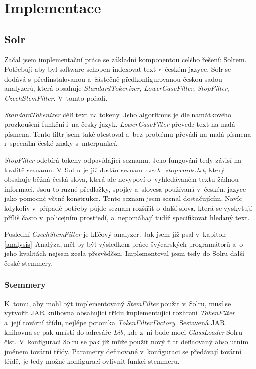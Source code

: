 \chapter{Implementace}
\section{Solr}
Začal jsem implementační práce se základní komponentou celého řešení: Solrem. Potřebuji aby byl software schopen indexovat text v~českém jazyce. Solr se dodává s~předinstalovanou a~částečně předkonfigurovanou českou sadou analyzerů, která obsahuje \emph{StandardTokenizer}, \emph{LowerCaseFilter}, \emph{StopFilter}, \emph{CzechStemFilter}. V~tomto pořadí. 

\emph{StandardTokenizer} dělí text na tokeny. Jeho algoritmus je dle namátkového prozkoušení funkční i~na český jazyk. \emph{LowerCaseFilter} převede text na malá písmena. Tento filtr jsem také otestoval a~bez problému převádí na malá písmena i~speciální české znaky s~interpunkcí. 

\emph{StopFilter} odebírá tokeny odpovídající seznamu. Jeho fungování tedy závisí na kvalitě seznamu. V~Solru je již dodán seznam \emph{czech\_stopwords.txt}, který obsahuje běžná česká slova, která ale nevypoví o~vyhledávaném textu žádnou informaci. Jsou to různé předložky, spojky a~slovesa používaná v~českém jazyce jako pomocné větné konstrukce. Tento seznam jsem seznal dostačujícím. Navíc kdykoliv v~případě potřeby půjde seznam rozšířit o~další slova, která se vyskytují příliš často v~policejním prostředí, a~nepomáhají tudíž specifikovat hledaný text.

Poslední \emph{CzechStemFilter} je klíčový analyzer. Jak jsem již psal v~kapitole \ref{analysis}~Analýza, měl by být výsledkem práce švýcarských programátorů a~o jeho kvalitách nejsem zcela přesvědčen. Implementoval jsem tedy do Solru další české stemmery.

\subsection{Stemmery}
K~tomu, aby mohl být implementovaný \emph{StemFilter} použit v~Solru, musí se vytvořit JAR knihovna obsahující třídu implementující rozhraní \emph{TokenFilter} a~její tovární třídu, nejlépe potomka \emph{TokenFilterFactory}. Sestavená JAR knihovna se pak umístí do adresáře \emph{Lib}, kde z~ní bude moci \emph{ClassLoader} Solru číst. V~konfiguraci Solru se pak již může použít nový filtr definovaný absolutním jménem tovární třídy. Parametry definované v~konfiguraci se předávají tovární třídě, je tedy možné konfigurací ovlivnit funkci stemmeru.

